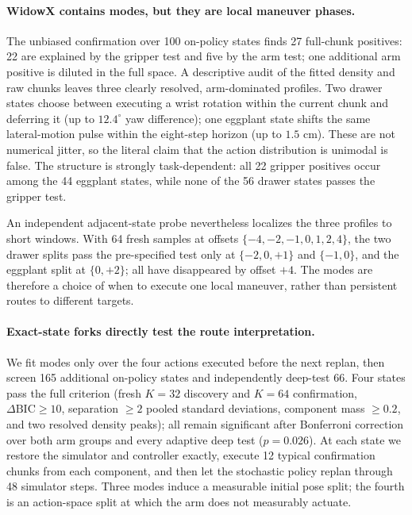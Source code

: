 \paragraph{WidowX contains modes, but they are local maneuver phases.}
The unbiased confirmation over 100 on-policy states finds 27 full-chunk
positives: 22 are explained by the gripper test and five by the arm test; one
additional arm positive is diluted in the full space. A descriptive audit of
the fitted density and raw chunks leaves three clearly resolved, arm-dominated
profiles. Two drawer states choose between executing a wrist rotation within
the current chunk and deferring it (up to $12.4^\circ$ yaw difference); one
eggplant state shifts the same lateral-motion pulse within the eight-step
horizon (up to $1.5$ cm). These are not numerical jitter, so the literal claim
that the action distribution is unimodal is false. The structure is strongly
task-dependent: all 22 gripper positives occur among the 44 eggplant states,
while none of the 56 drawer states passes the gripper test.

An independent adjacent-state probe nevertheless localizes the three profiles
to short windows. With 64 fresh samples at offsets
$\{-4,-2,-1,0,1,2,4\}$, the two drawer splits pass the pre-specified test only
at $\{-2,0,+1\}$ and $\{-1,0\}$, and the eggplant split at $\{0,+2\}$; all
have disappeared by offset $+4$. The modes are therefore a choice of when to
execute one local maneuver, rather than persistent routes to different targets.

\paragraph{Exact-state forks directly test the route interpretation.}
We fit modes only over the four actions executed before the next replan, then
screen 165 additional on-policy states and independently deep-test 66. Four
states pass the full criterion (fresh $K{=}32$ discovery and $K{=}64$
confirmation, $\Delta\mathrm{BIC}\geq10$, separation $\geq2$ pooled standard
deviations, component mass $\geq0.2$, and two resolved density peaks); all
remain significant after Bonferroni correction over both arm groups and every
adaptive deep test ($p=0.026$). At each state we restore the simulator and
controller exactly, execute 12 typical confirmation chunks from each
component, and then let the stochastic policy replan through 48 simulator
steps. Three modes induce a measurable initial pose split; the fourth is an
action-space split at which the arm does not measurably actuate.

